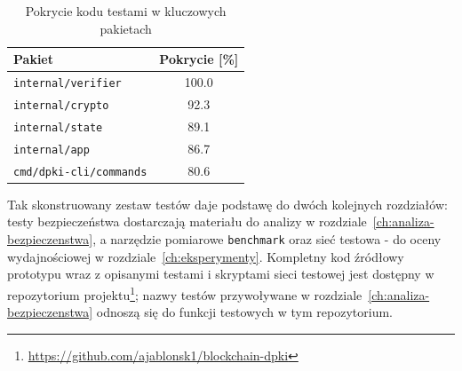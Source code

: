 \begin{table}[H]
    \centering
    \caption{Pokrycie kodu testami w kluczowych pakietach}
    \label{tab:pokrycie}
    \begin{tabular}{l S[table-format=3.1]}
        \toprule
        \textbf{Pakiet}                & {\textbf{Pokrycie [\%]}} \\
        \midrule
        \texttt{internal/verifier}     & 100.0                    \\
        \texttt{internal/crypto}       & 92.3                     \\
        \texttt{internal/state}        & 89.1                     \\
        \texttt{internal/app}          & 86.7                     \\
        \texttt{cmd/dpki-cli/commands} & 80.6                     \\
        \bottomrule
    \end{tabular}
\end{table}

Tak skonstruowany zestaw testów daje podstawę do dwóch kolejnych rozdziałów: testy bezpieczeństwa dostarczają materiału do analizy w rozdziale~\ref{ch:analiza-bezpieczenstwa}, a narzędzie pomiarowe \texttt{benchmark} oraz sieć testowa - do oceny wydajnościowej w rozdziale~\ref{ch:eksperymenty}. Kompletny kod źródłowy prototypu wraz z opisanymi testami i skryptami sieci testowej jest dostępny w repozytorium projektu\footnote{\url{https://github.com/ajablonsk1/blockchain-dpki}}; nazwy testów przywoływane w rozdziale~\ref{ch:analiza-bezpieczenstwa} odnoszą się do funkcji testowych w tym repozytorium.
